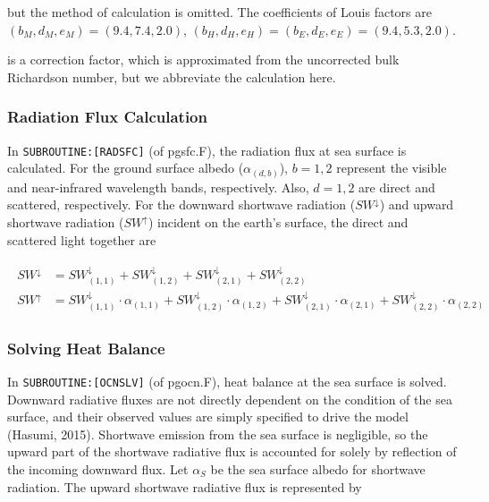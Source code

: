 but the method of calculation is omitted. The coefficients of Louis
factors are \(( b_M, d_M, e_M ) = ( 9.4, 7.4, 2.0 )\),
\(( b_H, d_H, e_H ) = ( b_E, d_E, e_E ) = ( 9.4, 5.3, 2.0 )\).

is a correction factor, which is approximated from the uncorrected bulk
Richardson number, but we abbreviate the calculation here.

\hypertarget{radiation-flux-calculation}{%
\subsubsection{Radiation Flux
Calculation}\label{radiation-flux-calculation}}

In \texttt{SUBROUTINE:{[}RADSFC{]}} (of pgsfc.F), the radiation flux at
sea surface is calculated. For the ground surface albedo
(\(\alpha_{(d,b)}\)), \(b=1,2\) represent the visible and near-infrared
wavelength bands, respectively. Also, \(d=1,2\) are direct and
scattered, respectively. For the downward shortwave radiation
(\(SW^\downarrow\)) and upward shortwave radiation (\(SW^\uparrow\))
incident on the earth's surface, the direct and scattered light together
are

\begin{eqnarray}
\begin{array}{rl}
    SW^\downarrow &= SW^\downarrow_{(1,1)}+SW^\downarrow_{(1,2)}+SW^\downarrow_{(2,1)}+SW^\downarrow_{(2,2)}\\
SW^\uparrow &= SW^\downarrow_{(1,1)}\cdot\alpha_{(1,1)}+SW^\downarrow_{(1,2)}\cdot\alpha_{(1,2)}+SW^\downarrow_{(2,1)}\cdot\alpha_{(2,1)}+SW^\downarrow_{(2,2)}\cdot\alpha_{(2,2)}
\end{array}
\end{eqnarray}

\hypertarget{solving-heat-balance}{%
\subsubsection{Solving Heat Balance}\label{solving-heat-balance}}

In \texttt{SUBROUTINE:{[}OCNSLV{]}} (of pgocn.F), heat balance at the
sea surface is solved. Downward radiative fluxes are not directly
dependent on the condition of the sea surface, and their observed values
are simply specified to drive the model (Hasumi, 2015). Shortwave
emission from the sea surface is negligible, so the upward part of the
shortwave radiative flux is accounted for solely by reflection of the
incoming downward flux. Let \(\alpha _S\) be the sea surface albedo for
shortwave radiation. The upward shortwave radiative flux is represented
by

